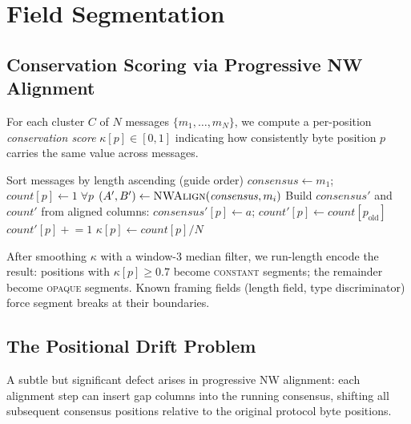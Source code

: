 \documentclass[letterpaper,twocolumn,10pt]{article}
\begin{document}
\section{Field Segmentation}
\label{sec:segment}

\subsection{Conservation Scoring via Progressive NW Alignment}
\label{sec:align}

For each cluster $C$ of $N$ messages $\{m_1, \ldots, m_N\}$, we compute a
per-position \emph{conservation score} $\kappa[p] \in [0,1]$ indicating how
consistently byte position $p$ carries the same value across messages.

\begin{algorithm}[t]
\caption{Progressive NW alignment for conservation scoring}
\label{alg:align}
\begin{algorithmic}[1]
\State Sort messages by length ascending (guide order)
\State $\mathit{consensus} \gets m_1$;\; $\mathit{count}[p] \gets 1\;\forall p$
  \State $(A', B') \gets \textsc{NWAlign}(\mathit{consensus}, m_i)$
  \State Build $\mathit{consensus}'$ and $\mathit{count}'$ from aligned columns:
      $\mathit{consensus}'[p] \gets a$;\; $\mathit{count}'[p] \gets \mathit{count}[p_\text{old}]$
    \EndIf
      $\mathit{count}'[p] \mathrel{+}= 1$
    \EndIf
  \EndFor
\EndFor
\State $\kappa[p] \gets \mathit{count}[p] / N$
\end{algorithmic}
\end{algorithm}

After smoothing $\kappa$ with a window-3 median filter, we run-length encode
the result: positions with $\kappa[p] \geq 0.7$ become \textsc{constant}
segments; the remainder become \textsc{opaque} segments.  Known framing fields
(length field, type discriminator) force segment breaks at their boundaries.

\subsection{The Positional Drift Problem}
\label{sec:drift}

A subtle but significant defect arises in progressive NW alignment: each
alignment step can insert gap columns into the running consensus, shifting all
subsequent consensus positions relative to the original protocol byte positions.
\end{document}
